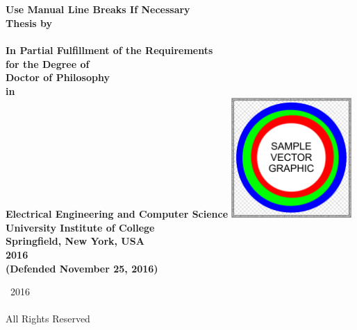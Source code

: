 

\thispagestyle{empty}

\begingroup
\centering
{}
~
\\[1em]
\sffamily\bfseries\fontsize{26}{31.2}\selectfont
\DocumentTitle
\\
Use Manual Line Breaks If Necessary
\\[0.4in]
\normalfont\large
Thesis by
\\[0.25em]
\sffamily\bfseries\Large
\AuthorName
\\[0.4in]
\normalfont\normalsize
In Partial Fulfillment of the Requirements
\\[0.5em]
for the Degree of
\\[0.5em]
Doctor of Philosophy
\\[0.5em]
in
\\[0.5em]
Electrical Engineering and Computer Science
\vfill
\includegraphics[height=1.8in]
{Figure-SchoolLogo}
\\[1.5em]
University Institute of College
\\[0.5em]
Springfield, New York, USA
\\[1.5em]
2016
\\[0.5em]
(Defended November 25, 2016)
\par
\endgroup

\clearpage


\pagestyle{plain}
\setcounter{page}{2}

\begingroup
\centering
{}
\null
\vfill
{\sffamily\textcopyright}~2016
\\[0.5em]
\AuthorName
\\[0.5em]
All Rights Reserved
\par
\endgroup


